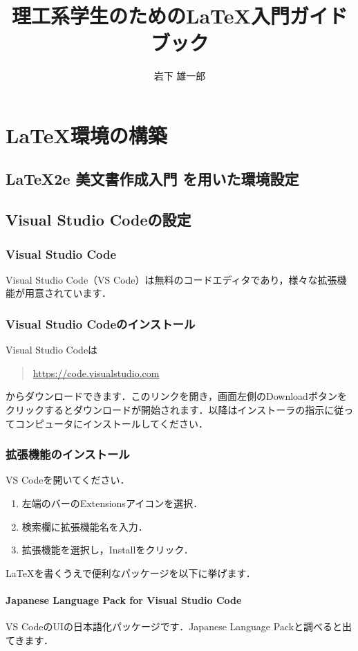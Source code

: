 \documentclass[a4paper,dvipdfmx]{jsreport}
\title{理工系学生のための\LaTeX 入門ガイドブック}
\author{岩下 雄一郎}
\begin{document}
\maketitle
\tableofcontents

\part{\LaTeX 環境の構築}
\chapter{\LaTeX2e 美文書作成入門 を用いた環境設定}
\chapter{Visual Studio Codeの設定}

\section{Visual Studio Code}
Visual Studio Code（VS Code）は無料のコードエディタであり，様々な拡張機能が用意されています．

\section{Visual Studio Codeのインストール}
Visual Studio Codeは
\begin{quote}
    \url{https://code.visualstudio.com}
\end{quote}
からダウンロードできます．このリンクを開き，画面左側のDownloadボタンをクリックするとダウンロードが開始されます．以降はインストーラの指示に従ってコンピュータにインストールしてください．

\section{拡張機能のインストール}
VS Codeを開いてください．

\begin{enumerate}
    \item 左端のバーのExtensionsアイコンを選択．
    \item 検索欄に拡張機能名を入力．
    \item 拡張機能を選択し，Installをクリック．
\end{enumerate}

\LaTeX を書くうえで便利なパッケージを以下に挙げます．

\subsection{Japanese Language Pack for Visual Studio Code}
VS CodeのUIの日本語化パッケージです．Japanese Language Packと調べると出てきます．
\end{document}
